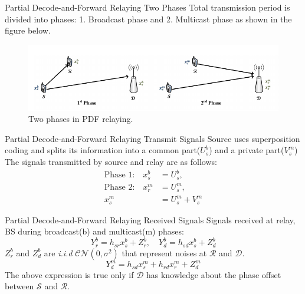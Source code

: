 \documentclass{beamer}
\begin{document}
\begin{frame}{Partial Decode-and-Forward Relaying} {Two Phases}
Total transmission period is divided into phases: 1. Broadcast phase and 2. Multicast phase as shown in the figure below.
\begin{figure}
\centering
\includegraphics[width=\textwidth]{figures/pdfRelaying.png}
  \caption{Two phases in PDF relaying.}
\end{figure}
\end{frame}

\begin{frame}{Partial Decode-and-Forward Relaying} {Transmit Signals}
Source uses superposition coding and splits its information into a
	common part($U_s^b$) and a private part($V_s^m$) \\ 
	\vspace{1cm}
The signals transmitted by source and relay are as follows:
\begin{align*}
\text{Phase 1:}\quad x^b_s &=  U_s^b, \\
\text{Phase 2:}\quad x_r^m &= U_s^{m}, \\ 
 x^m_s &= U_s^{m} + V_s^{m} 
\end{align*}
\vspace{-0.5cm}
\end{frame}

\begin{frame}{Partial Decode-and-Forward Relaying} {Received Signals}
\vspace{-1cm}
Signals received at relay, BS during broadcast(b) and multicast(m) phases:
\begin{equation*}
Y_r^b = h_{sr}x^b_s + Z_r^b , \quad Y_d^b = h_{sd}x^b_s + Z_d^b
\end{equation*}
$Z_r^b$ and $Z_d^b$ are \textit{i.i.d} $\mathcal{CN}(0,\sigma^2)$ that represent noises at $\mathcal{R}$ and $\mathcal{D}$. \\
\pause
\begin{equation*}
Y_d^m = h_{sd}x^m_s + h_{rd}x_r^m + Z_d^m
\end{equation*}
The above expression is true only if $\mathcal{D}$ has knowledge about the phase offset between $\mathcal{S}$ and $\mathcal{R}$. 
\end{frame}
\end{document}
